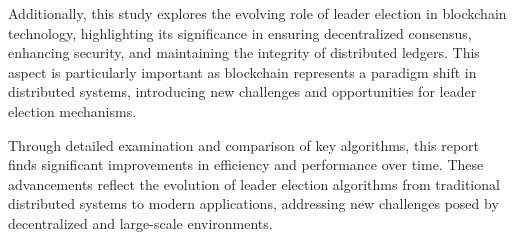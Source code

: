 Additionally, this study explores the evolving role of leader election in blockchain technology, highlighting its significance in ensuring decentralized consensus, enhancing security, and maintaining the integrity of distributed ledgers. This aspect is particularly important as blockchain represents a paradigm shift in distributed systems, introducing new challenges and opportunities for leader election mechanisms.

Through detailed examination and comparison of key algorithms, this report finds significant improvements in efficiency and performance over time. These advancements reflect the evolution of leader election algorithms from traditional distributed systems to modern applications, addressing new challenges posed by decentralized and large-scale environments.
